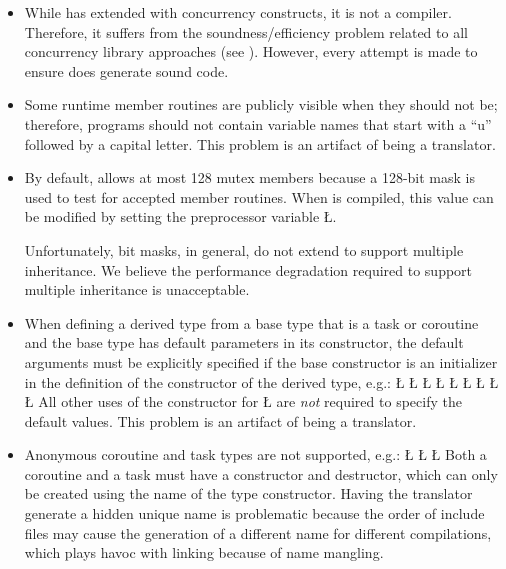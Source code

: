 \documentclass[openright,twoside]{report}
\begin{document}
\begin{itemize}
\item
While \uC has extended \CC with concurrency constructs, it is not a compiler.
Therefore, it suffers from the soundness/efficiency problem related to all concurrency library approaches (see ).
However, every attempt is made to ensure \uC does generate sound code.

\item
Some runtime member routines are publicly visible when they should not be;
therefore, \uC programs should not contain variable names that start with a ``u'' followed by a capital letter.
This problem is an artifact of \uC being a translator.

\item
By default, \uC allows at most 128 mutex members because a 128-bit mask is used to test for accepted member routines.
When \uC is compiled, this value can be modified by setting the preprocessor variable \LGinlinetrue\LGbegin\lgrinde\L{}\endlgrinde\LGend{}.

Unfortunately, bit masks, in general, do not extend to support multiple inheritance.
We believe the performance degradation required to support multiple inheritance is unacceptable.

\item
When defining a derived type from a base type that is a task or coroutine and the base type has default parameters in its constructor, the default arguments must be explicitly specified if the base constructor is an initializer in the definition of the constructor of the derived type, e.g.:
\LGinlinefalse\LGbegin\lgrinde
\L{}
\L{}
\L{\LB{}}
\L{\LB{\};}}
\L{\LB{}}
\L{}
\L{}
\L{\LB{}}
\CE{}\L{\LB{\};}}
\endlgrinde\LGend
All other uses of the constructor for \LGinlinetrue\LGbegin\lgrinde\L{}\endlgrinde\LGend{} are \emph{not} required to specify the default values.
This problem is an artifact of \uC being a translator.

\item
Anonymous coroutine and task types are not supported, e.g.:
\LGinlinefalse\LGbegin\lgrinde
\L{}
\CE{}\L{\LB{}}
\L{}
\endlgrinde\LGend
Both a coroutine and a task must have a constructor and destructor, which can only be created using the name of the type constructor.
Having the translator generate a hidden unique name is problematic because the order of include files may cause the generation of a different name for different compilations, which plays havoc with linking because of name mangling.


\end{itemize}
\end{document}
